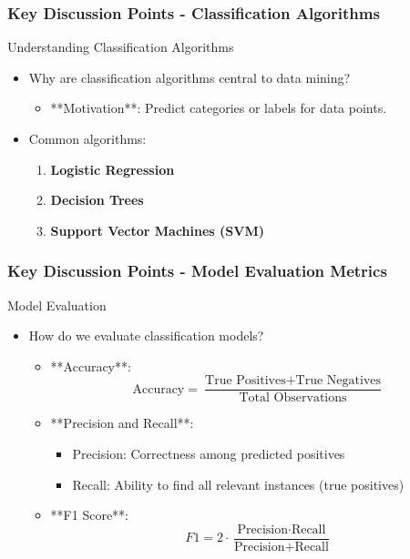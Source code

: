 \documentclass[aspectratio=169]{beamer}
\begin{document}
\begin{frame}[fragile]
    \frametitle{Key Discussion Points - Classification Algorithms}
    \begin{block}{Understanding Classification Algorithms}
        \begin{itemize}
            \item Why are classification algorithms central to data mining?
            \begin{itemize}
                \item **Motivation**: Predict categories or labels for data points.
            \end{itemize}
            \item Common algorithms:
            \begin{enumerate}
                \item \textbf{Logistic Regression}
                \item \textbf{Decision Trees}
                \item \textbf{Support Vector Machines (SVM)}
            \end{enumerate}
        \end{itemize}
    \end{block}
\end{frame}

\begin{frame}[fragile]
    \frametitle{Key Discussion Points - Model Evaluation Metrics}
    \begin{block}{Model Evaluation}
        \begin{itemize}
            \item How do we evaluate classification models?
            \begin{itemize}
                \item **Accuracy**:
                \[
                \text{Accuracy} = \frac{\text{True Positives} + \text{True Negatives}}{\text{Total Observations}}
                \]
                \item **Precision and Recall**:
                    \begin{itemize}
                        \item Precision: Correctness among predicted positives
                        \item Recall: Ability to find all relevant instances (true positives)
                    \end{itemize}
                \item **F1 Score**:
                \[
                F1 = 2 \cdot \frac{\text{Precision} \cdot \text{Recall}}{\text{Precision} + \text{Recall}}
                \]
            \end{itemize}
        \end{itemize}
    \end{block}
\end{frame}
\end{document}
